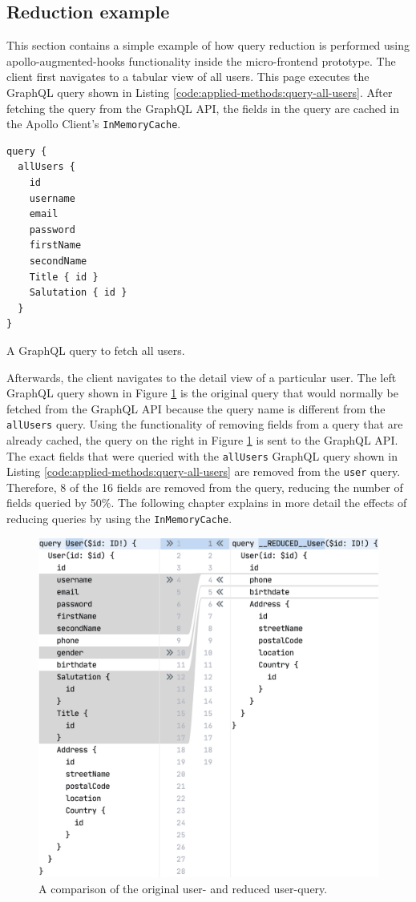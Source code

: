 \subsection{Reduction example}\label{subsection:background:graphql:example-reduction}

This section contains a simple example of how query reduction is performed using apollo-augmented-hooks functionality inside the micro-frontend prototype. The client first navigates to a tabular view of all users. This page executes the GraphQL query shown in Listing \ref{code:applied-methods:query-all-users}. After fetching the query from the GraphQL \ac{API}, the fields in the query are cached in the Apollo Client's \texttt{InMemoryCache}.

\ifshowListings
  \begin{listing}[H]
  \begin{verbatim}
query {
  allUsers {
    id
    username
    email
    password
    firstName
    secondName
    Title { id }
    Salutation { id }
  }
}
  \end{verbatim}
  \caption{A GraphQL query to fetch all users.}\label{code:applied-methods:query-all-users}
  \end{listing}
\fi

\noindent Afterwards, the client navigates to the detail view of a particular user. The left GraphQL query shown in Figure \ref{fig:applied-methods:comparison-user-reduced-user} is the original query that would normally be fetched from the GraphQL \ac{API} because the query name is different from the \texttt{allUsers} query. Using the functionality of removing fields from a query that are already cached, the query on the right in Figure \ref{fig:applied-methods:comparison-user-reduced-user} is sent to the GraphQL \ac{API}. The exact fields that were queried with the \texttt{allUsers} GraphQL query shown in Listing \ref{code:applied-methods:query-all-users} are removed from the \texttt{user} query. Therefore, 8 of the 16 fields are removed from the query, reducing the number of fields queried by 50\%. The following chapter explains in more detail the effects of reducing queries by using the \texttt{InMemoryCache}.

\ifshowImages
\begin{figure}[H]
  \centering
  \includegraphics[width=0.65\linewidth]{images/reduction-graphql-examples/compare-user-reduced-user.png}
  \caption{A comparison of the original user- and reduced user-query.}\label{fig:applied-methods:comparison-user-reduced-user}
\end{figure}
\fi
